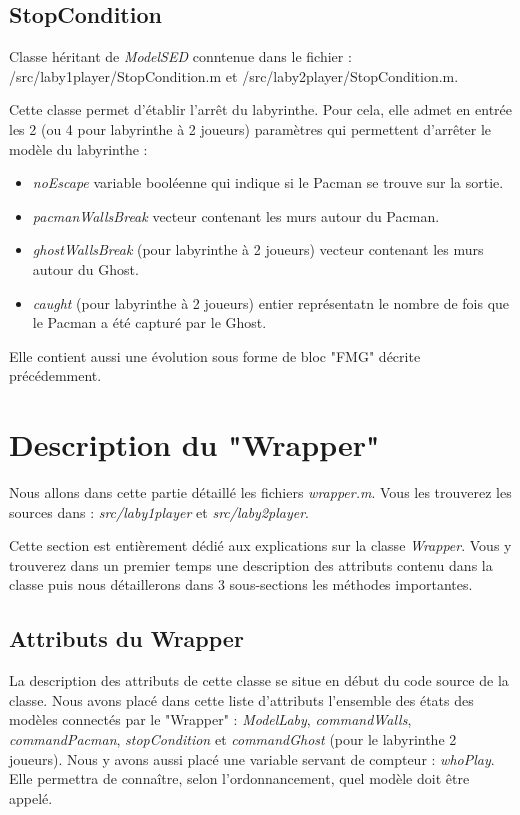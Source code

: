 \subsection{StopCondition}\label{subsec:StopCondition}
\begin{center}
Classe héritant de \emph{ModelSED} conntenue dans le fichier : /src/laby1player/StopCondition.m et /src/laby2player/StopCondition.m.
\end{center}
Cette classe permet d'établir l'arrêt du labyrinthe. Pour cela, elle admet en entrée les 2 (ou 4 pour labyrinthe à 2 joueurs) paramètres qui permettent d'arrêter le modèle du labyrinthe : \begin{itemize}
\item [\textbullet] \emph{noEscape} variable booléenne qui indique si le Pacman se trouve sur la sortie.
\item [\textbullet] \emph{pacmanWallsBreak} vecteur contenant les murs autour du Pacman.
\item [\textbullet] \emph{ghostWallsBreak} (pour labyrinthe à 2 joueurs) vecteur contenant les murs autour du Ghost.
\item [\textbullet] \emph{caught} (pour labyrinthe à 2 joueurs) entier représentatn le nombre de fois que le Pacman a été capturé par le Ghost.
\end{itemize}
Elle contient aussi une évolution sous forme de bloc "FMG" décrite précédemment. 

\section{Description du "Wrapper"}\label{sec:Wrapper}
\begin{center}
Nous allons dans cette partie détaillé les fichiers \emph{wrapper.m}. Vous les trouverez les sources dans : \textit{src/laby1player} et \textit{src/laby2player}.
\end{center}
Cette section est entièrement dédié aux explications sur la classe \emph{Wrapper}. Vous y trouverez dans un premier temps une description des attributs contenu dans la classe puis nous détaillerons dans 3 sous-sections les méthodes importantes.
\subsection{Attributs du Wrapper}
La description des attributs de cette classe se situe en début du code source de la classe. Nous avons placé dans cette liste d'attributs l'ensemble des états des modèles connectés par le "Wrapper" : \emph{ModelLaby}, \emph{commandWalls}, \emph{commandPacman}, \emph{stopCondition} et \emph{commandGhost} (pour le labyrinthe 2 joueurs). Nous y avons aussi placé une variable servant de compteur : \emph{whoPlay}. Elle permettra de connaître, selon l'ordonnancement, quel modèle doit être appelé. 


